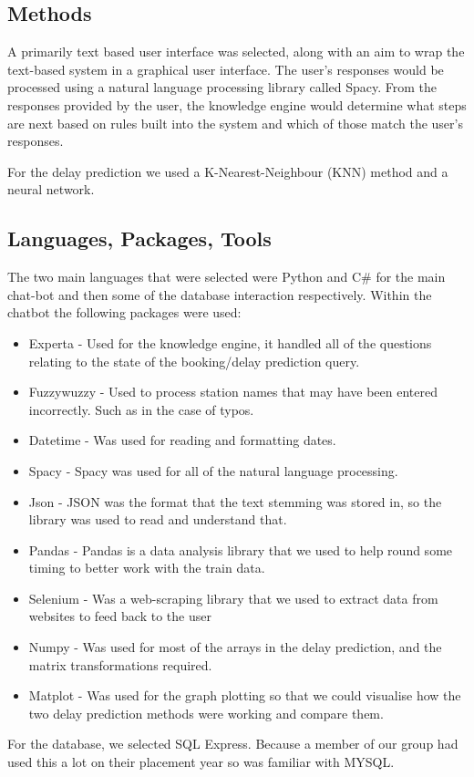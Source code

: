 \documentclass[11pt]{article}
\begin{document}
	\subsection{Methods}
	
A primarily text based user interface was selected, along with an aim to wrap the text-based system in a graphical user interface. The user’s responses would be processed using a natural language processing library called Spacy. From the responses provided by the user, the knowledge engine would determine what steps are next based on rules built into the system and which of those match the user’s responses.


For the delay prediction we used a K-Nearest-Neighbour (KNN) method and a neural network. 
	
	\subsection{Languages, Packages, Tools}
	
	The two main languages that were selected were Python and C\# for the main chat-bot and then some of the database interaction respectively.
	Within the chatbot the following packages were used:
	\begin{itemize}
		\item Experta - Used for the knowledge engine, it handled all of the questions relating to the state of the booking/delay prediction query.
	\item Fuzzywuzzy - Used to process station names that may have been entered incorrectly. Such as in the case of typos.
	\item Datetime - Was used for reading and formatting dates.
	\item Spacy - Spacy was used for all of the natural language processing.
	\item Json - JSON was the format that the text stemming was stored in, so the library was used to read and understand that.
    \item Pandas - Pandas is a data analysis library that we used to help round some timing to better work with the train data.
	\item Selenium - Was a web-scraping library that we used to extract data from websites to feed back to the user 
	\item Numpy - Was used for most of the arrays in the delay prediction, and the matrix transformations required.
	\item Matplot - Was used for the graph plotting so that we could visualise how the two delay prediction methods were working and compare them.
\end{itemize}
	For the database, we selected SQL Express. Because a member of our group had used this a lot on their placement year so was familiar with MYSQL.	   
	
\end{document}
